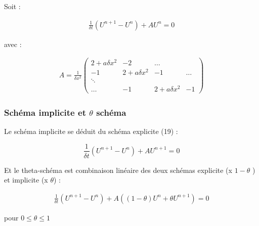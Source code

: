 \documentclass[french]{article}
\begin{document}
Soit :

\begin{align}
\frac{1}{\delta t}\left(U^{n+1}-U^{n}\right) + AU^{n}=0
\end{align}

avec :

\begin{align}
A = \frac{1}{\delta x^{2}}
\begin{pmatrix}
2+a\delta x^{2} & -2 & \hdots \\
-1 & 2+a\delta x^{2} & -1 & \hdots \\
\ddots \\
\hdots & -1 & 2+a\delta x^{2} & -1 
\end{pmatrix}
\end{align}

\subsubsection{Schéma implicite et $\theta $ schéma}

Le schéma implicite se déduit du schéma explicite (19) :

\[
\frac{1}{\delta t}\left(U^{n+1}-U^{n}\right) + AU^{n+1}=0
\]

Et le theta-schéma est combinaison linéaire des deux schémas explicite (x $1-\theta$ ) et implicite (x $\theta$) :

\begin{align}
\frac{1}{\delta t}\left(U^{n+1}-U^{n}\right) + 
A\left((1-\theta)U^{n}+\theta U^{n+1}\right)=0
\end{align}

pour $ 0 \leq \theta \leq 1 $
\end{document}
